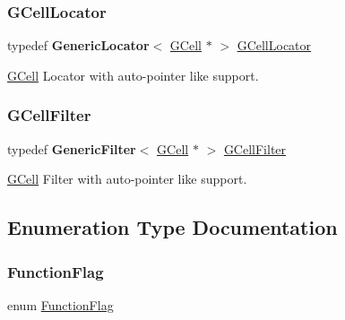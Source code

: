 \subsubsection{\texorpdfstring{G\+Cell\+Locator}{GCellLocator}}
{\footnotesize\ttfamily typedef \textbf{ Generic\+Locator}$<$ \mbox{\hyperlink{classKatabatic_1_1GCell}{G\+Cell}} $\ast$ $>$ \mbox{\hyperlink{namespaceKatabatic_ae192ef170a0ad390902e435ac1e6796a}{G\+Cell\+Locator}}}

\mbox{\hyperlink{classKatabatic_1_1GCell}{G\+Cell}} Locator with auto-\/pointer like support. \mbox{\label{namespaceKatabatic_a7d07e23d45818a2ae5f6881ce0ec7403}} 
\subsubsection{\texorpdfstring{G\+Cell\+Filter}{GCellFilter}}
{\footnotesize\ttfamily typedef \textbf{ Generic\+Filter}$<$ \mbox{\hyperlink{classKatabatic_1_1GCell}{G\+Cell}} $\ast$ $>$ \mbox{\hyperlink{namespaceKatabatic_a7d07e23d45818a2ae5f6881ce0ec7403}{G\+Cell\+Filter}}}

\mbox{\hyperlink{classKatabatic_1_1GCell}{G\+Cell}} Filter with auto-\/pointer like support. 

\subsection{Enumeration Type Documentation}
\mbox{\label{namespaceKatabatic_a2af2ad6b6441614038caf59d04b3b217}} 
\subsubsection{\texorpdfstring{Function\+Flag}{FunctionFlag}}
{\footnotesize\ttfamily enum \mbox{\hyperlink{namespaceKatabatic_a2af2ad6b6441614038caf59d04b3b217}{Function\+Flag}}}

